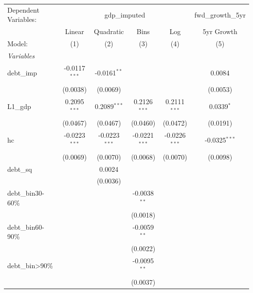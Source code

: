 
\begingroup
\centering
\begin{tabular}{lccccc}
   \tabularnewline \midrule \midrule
   Dependent Variables: & \multicolumn{4}{c}{gdp\_imputed} & fwd\_growth\_5yr\\
                      & Linear          & Quadratic       & Bins            & Log             & 5yr Growth \\   
   Model:             & (1)             & (2)             & (3)             & (4)             & (5)\\  
   \midrule
   \emph{Variables}\\
   debt\_imp          & -0.0117$^{***}$ & -0.0161$^{**}$  &                 &                 & 0.0084\\   
                      & (0.0038)        & (0.0069)        &                 &                 & (0.0053)\\   
   L1\_gdp            & 0.2095$^{***}$  & 0.2089$^{***}$  & 0.2126$^{***}$  & 0.2111$^{***}$  & 0.0339$^{*}$\\   
                      & (0.0467)        & (0.0467)        & (0.0460)        & (0.0472)        & (0.0191)\\   
   hc                 & -0.0223$^{***}$ & -0.0223$^{***}$ & -0.0221$^{***}$ & -0.0226$^{***}$ & -0.0325$^{***}$\\   
                      & (0.0069)        & (0.0070)        & (0.0068)        & (0.0070)        & (0.0098)\\   
   debt\_sq           &                 & 0.0024          &                 &                 &   \\   
                      &                 & (0.0036)        &                 &                 &   \\   
   debt\_bin30-60\%   &                 &                 & -0.0038$^{**}$  &                 &   \\   
                      &                 &                 & (0.0018)        &                 &   \\   
   debt\_bin60-90\%   &                 &                 & -0.0059$^{**}$  &                 &   \\   
                      &                 &                 & (0.0022)        &                 &   \\   
   debt\_bin>90\%     &                 &                 & -0.0095$^{**}$  &                 &   \\   
                      &                 &                 & (0.0037)        &                 &   \\   

\end{tabular}
